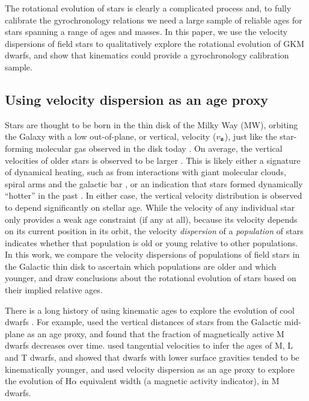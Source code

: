 \documentclass{aastex63}
\newcommand{\eg}{{\it e.g.}}
\newcommand{\vz}{$v_{\bf z}$}
\newcommand{\racomment}[1]{{\color{blue}#1}}
\begin{document}
The rotational evolution of stars is clearly a complicated process and, to
fully calibrate the gyrochronology relations we need a large sample of
reliable ages for stars spanning a range of ages and masses.
In this paper, we use the velocity dispersions of field stars to qualitatively
explore the rotational evolution of GKM dwarfs, and show that kinematics could
provide a gyrochronology calibration sample.

\subsection{Using velocity dispersion as an age proxy}

Stars are thought to be born in the thin disk of the Milky Way (MW), orbiting
the Galaxy with a low out-of-plane, or vertical, velocity (\vz),
just like the star-forming molecular gas observed in the disk today
\citep[\eg][]{stark1989, stark2005, aumer2009, martig2014, aumer2016}.
On average, the vertical velocities of older stars is observed to be larger
\citep[\eg][]{nordstrom2004, holmberg2007, holmberg2009, aumer2009,
casagrande2011}.
This is likely either a signature of dynamical heating, such as from
interactions with giant molecular clouds, spiral arms and the galactic bar
\citep[see][for a review of secular evolution in the MW]{sellwood2014}, or an
indication that stars formed dynamically ``hotter'' in the past
\citep[e.g.,][]{bird2013}.
In either case, the vertical velocity distribution is observed to depend
significantly on stellar age.
While the velocity of any individual star only provides a weak age constraint
\racomment{(if any at all)}, because its velocity depends on its current
position in its orbit, the velocity {\it dispersion} of a {\it population} of
stars indicates whether that population is old or young relative to other
populations.
In this work, we compare the velocity dispersions of populations of field
stars in the Galactic thin disk to ascertain which populations are older and
which younger, and draw conclusions about the rotational evolution of stars
based on their implied relative ages.

\racomment{ There is a long history of using kinematic ages to explore the
evolution of cool dwarfs \citep[\eg][]{reid1995, gizis2000, west2004,
west2006, schmidt2007, faherty2009, kiman2019}.
For example, \citet{west2004, west2006} used the vertical distances of stars
from the Galactic mid-plane as an age proxy, and found that the fraction of
magnetically active M dwarfs decreases over time.
\citet{faherty2009} used tangential velocities to infer the ages of M, L and T
dwarfs, and showed that dwarfs with lower surface gravities tended to be
kinematically younger, and \citet{kiman2019} used velocity dispersion as an
age proxy to explore the evolution of H$\alpha$ equivalent width (a magnetic
activity indicator), in M dwarfs.
}
\end{document}
